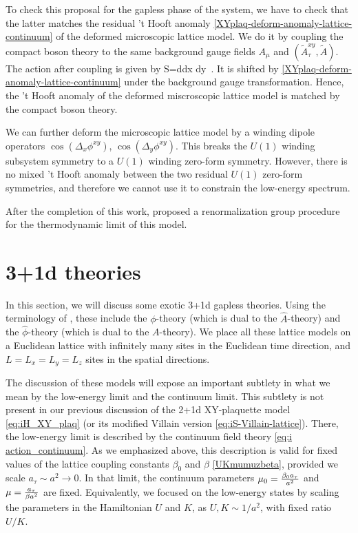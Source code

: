\documentclass[12pt]{article}
\numberwithin{equation}{section}
\def\d{\partial}
\begin{document}
To check this proposal for the gapless phase of the system, we have to check that the latter matches the residual 't Hooft anomaly \eqref{XYplaq-deform-anomaly-lattice-continuum} of the deformed microscopic lattice model.
We do it by coupling the compact boson theory to the same background gauge fields $A_\mu$ and $(\tilde A_\tau^{xy},\tilde A)$. The action after coupling is given by
\ie
S=\int d\tau dx dy\left[\frac{f}{2} (\d_\mu\phi-A_\mu)^2-\frac{i}{2\pi} \left(\tilde A_\tau^{xy}\d_x\d_y\phi+\tilde A \d_\tau\phi\right)\right]~.
\fe
It is shifted by \eqref{XYplaq-deform-anomaly-lattice-continuum} under the background gauge transformation. Hence, the 't Hooft anomaly of the deformed miscroscopic lattice model is matched by the compact boson theory.



We can further deform the microscopic lattice model by a winding dipole operators $\cos(\Delta_x\phi^{xy})$, $\cos(\Delta_y\phi^{xy})$. This breaks the $U(1)$ winding subsystem symmetry to a $U(1)$ winding zero-form symmetry.
However, there is no mixed 't Hooft anomaly between the two residual $U(1)$ zero-form symmetries, and therefore we cannot use it to constrain the low-energy spectrum.

After the completion of this work, \cite{Lake2021rg} proposed a renormalization group procedure for the thermodynamic limit of this model.



\section{3+1d theories}\label{sec:3+1d}

In this section, we will discuss some exotic 3+1d gapless theories.
Using the terminology of \cite{paper2,Gorantla:2021svj}, these include the $\phi$-theory (which is dual to the $\hat A$-theory) and the $\hat \phi$-theory (which is dual to the $A$-theory). We place all these lattice models on a Euclidean lattice with infinitely many sites in the Euclidean time direction, and $L=L_x=L_y=L_z$ sites in the spatial directions.

The discussion of these models will expose an important subtlety in what we mean by the low-energy limit and the continuum limit.  This subtlety is not present in our previous discussion of the 2+1d XY-plaquette model \eqref{eq:iH_XY_plaq} (or its modified Villain version \eqref{eq:iS-Villain-lattice}).  There, the low-energy limit is described by the continuum field theory \eqref{eq:i action_continuum}.  As we emphasized above, this description is valid for fixed values of the lattice coupling constants $\beta_0$ and $\beta$ \eqref{UKmumuzbeta}, provided we scale $a_\tau \sim a^2\to 0$.  In that limit, the continuum parameters $\mu_0= {\beta_0 a_\tau \over a^2}$ and $\mu={a_\tau \over \beta a^2}$ are fixed.  Equivalently, we focused on the low-energy states by scaling the parameters in the Hamiltonian $U$ and $K$, as $U,K \sim 1/a^2$, with fixed ratio $U/K$.
\end{document}
